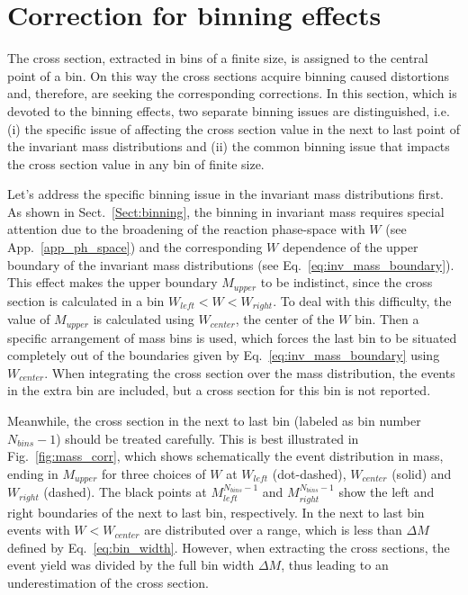 
\section{Correction for binning effects}
\label{Sect:bin_cor}

The cross section, extracted in bins of a finite size, is assigned to the central point of a bin. On this way the cross sections acquire binning caused distortions and, therefore, are seeking the corresponding corrections. In this section, which is devoted to the binning effects, two separate binning issues are distinguished, i.e. (i) the specific issue of affecting the cross section value in the next to last point of the invariant mass distributions and (ii) the common binning issue that impacts the cross section value in any bin of finite size. 

Let's address the specific binning issue in the invariant mass distributions first. As shown in Sect.~\ref{Sect:binning}, the binning in invariant mass requires special attention due to the broadening of the reaction phase-space with $W$ (see App.~\ref{app_ph_space}) and the corresponding $W$ dependence of the upper boundary of the invariant mass distributions (see Eq.~\eqref{eq:inv_mass_boundary}). This effect makes the upper boundary $M_{upper}$ to be indistinct, since the cross section is calculated in a bin $W_{left} < W < W_{right}$. To deal with this difficulty, the value of $M_{upper}$ is calculated using $W_{center}$, the center of the $W$ bin. Then a specific arrangement of mass bins is used, which forces the last bin to be situated completely out of the boundaries given by Eq.~\eqref{eq:inv_mass_boundary} using $W_{center}$. When integrating the cross section over the mass distribution, the events in the extra bin are included, but a cross section for this bin is not reported.


Meanwhile, the cross section in the next to last bin (labeled as bin number $N_{bins}-1$) should be treated carefully. This is best illustrated in Fig.~\ref{fig:mass_corr}, which shows schematically the event distribution in mass, ending in $M_{upper}$ for three choices of $W$ at $W_{left}$ (dot-dashed), $W_{center}$ (solid) and $W_{right}$ (dashed). The black points at $M^{N_{bins}-1}_{left}$ and $M^{N_{bins}-1}_{right}$ show the left and right boundaries of the next to last bin, respectively. In the next to last bin events with $W < W_{center}$ are distributed over a range, which is less than $\Delta M$ defined by Eq.~\eqref{eq:bin_width}. However, when extracting the cross sections, the event yield was divided by the full bin width $\Delta M$, thus leading to an underestimation of the cross section.



